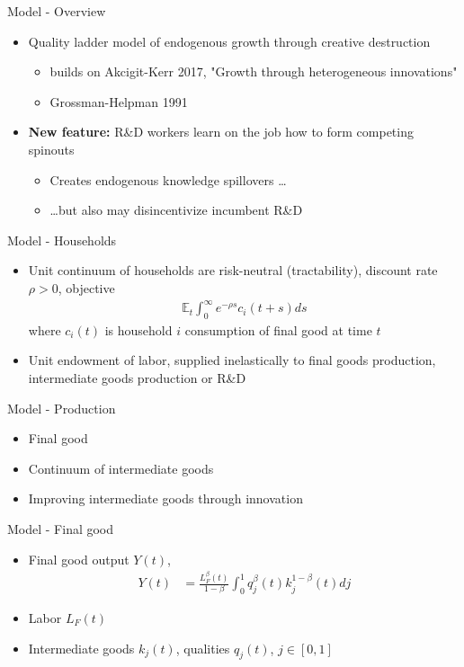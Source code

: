 \documentclass[english,usenames,dvipsnames]{beamer}
\begin{document}
\begin{frame}{Model - Overview}
\begin{itemize}	
	\item Quality ladder model of endogenous growth through creative destruction 
	\begin{itemize}
		\item builds on Akcigit-Kerr 2017, "Growth through heterogeneous innovations"
		\item Grossman-Helpman 1991
	\end{itemize}
	\item \textbf{New feature:} R\&D workers \alert{learn on the job} how to form \alert{competing spinouts}
	\begin{itemize}
		\item Creates \alert{endogenous knowledge spillovers} \ldots
		\item \ldots but also may \alert{disincentivize incumbent R\&D}
	\end{itemize} 
\end{itemize}
\end{frame}

\begin{frame}{Model - Households}
\begin{itemize}
	\item Unit continuum of households are risk-neutral (tractability), discount rate $\rho > 0$, objective
	\begin{align*}
		\mathbb{E}_t \int_0^{\infty} e^{-\rho s} c_i(t+s) ds
	\end{align*}
	where $c_i(t)$ is household $i$ consumption of final good at time $t$
	\item Unit endowment of labor, supplied inelastically to final goods production, intermediate goods production or R\&D
\end{itemize}
\end{frame}

\begin{frame}{Model - Production}
\begin{itemize}
	\item Final good
	\item Continuum of intermediate goods
	\item Improving intermediate goods through innovation
\end{itemize}
\end{frame}


\begin{frame}{Model - Final good}
\begin{itemize}
	\item Final good output $Y(t)$,
	\begin{align*}
		Y(t) &= \frac{L_F^{\beta}(t)}{1-\beta} \int_0^1 q_j^{\beta}(t) k_j^{1-\beta} (t) dj 
	\end{align*}
	\item Labor $L_F(t)$
	\item Intermediate goods $k_j(t)$, qualities $q_j(t)$, $j \in [0,1]$
\end{itemize}
\end{frame}
\end{document}
